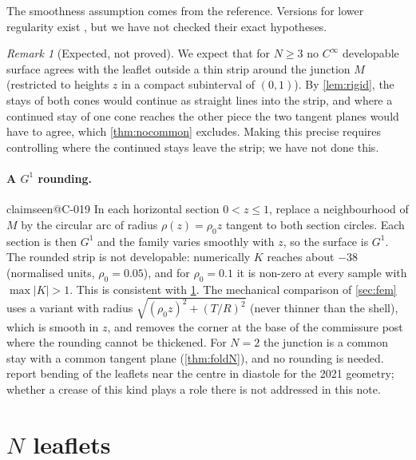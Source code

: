 \documentclass[11pt,a4paper]{article}
\makeatletter
\theoremstyle{plain}
\theoremstyle{remark}
\newtheorem{remark}[theorem]{Remark}
\newcommand{\claim}[1]{\ifcsname claimseen@#1\endcsname\else\expandafter\gdef\csname claimseen@#1\endcsname{}\label{claim:#1}\fi}
\makeatother
\begin{document}
The smoothness assumption comes from the reference. Versions for lower regularity exist \citep[e.g.][]{HartmanNirenberg1959},
but we have not checked their exact hypotheses.

\begin{remark}[Expected, not proved]\label{rem:expected}
We expect that for $N\ge3$ no $C^\infty$ developable surface agrees with the leaflet outside a thin strip around the
junction $M$ (restricted to heights $z$ in a compact subinterval of $(0,1)$). By \cref{lem:rigid}, the stays of both cones
would continue as straight lines into the strip, and where a continued stay of one cone reaches the other piece the two
tangent planes would have to agree, which \cref{thm:nocommon} excludes. Making this precise requires controlling where the
continued stays leave the strip; we have not done this.
\end{remark}

\paragraph{A $G^1$ rounding.}\claim{C-019} In each horizontal section $0<z\le1$, replace a neighbourhood of $M$ by the
circular arc of radius $\rho(z)=\rho_0 z$ tangent to both section circles. Each section is then $G^1$ and the family varies
smoothly with $z$, so the surface is $G^1$. The rounded strip is not developable: numerically $K$ reaches about $-38$
(normalised units, $\rho_0=0.05$), and for $\rho_0=0.1$ it is non-zero at every sample with $\max|K|>1$. This is consistent
with \cref{rem:expected}. The mechanical comparison of \cref{sec:fem} uses a variant with radius $\sqrt{(\rho_0z)^2+(T/R)^2}$
(never thinner than the shell), which is smooth in $z$, and removes the corner at the base of the commissure post where the
rounding cannot be thickened. For $N=2$ the junction is a common stay with a common tangent plane (\cref{thm:foldN}), and no
rounding is needed. \citet{Oliveira2024} report bending of the leaflets near the centre in diastole for the 2021 geometry;
whether a crease of this kind plays a role there is not addressed in this note.

\section{$N$ leaflets}\label{sec:N}
\end{document}
